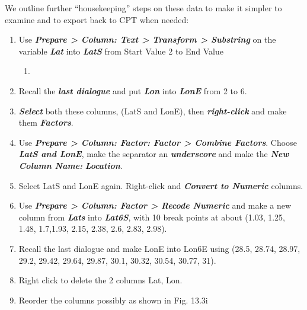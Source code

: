 \documentclass[
  letterpaper,
  DIV=11,
  numbers=noendperiod]{scrreprt}
\providecommand{\tightlist}{%
  \setlength{\itemsep}{0pt}\setlength{\parskip}{0pt}}\usepackage{longtable,booktabs,array}
\begin{document}
We outline further ``housekeeping'' steps on these data to make it
simpler to examine and to export back to CPT when needed:

\begin{enumerate}
\def\labelenumi{\alph{enumi})}
\item
  Use \textbf{\emph{Prepare \textgreater{} Column: Text \textgreater{}
  Transform \textgreater{} Substring}} on the variable
  \textbf{\emph{Lat}} into \textbf{\emph{LatS}} from Start Value 2 to
  End Value

  \begin{enumerate}
  \def\labelenumii{\arabic{enumii}.}
  \setcounter{enumii}{4}
  \tightlist
  \item
  \end{enumerate}
\item
  Recall the \textbf{\emph{last dialogue}} and put \textbf{\emph{Lon}}
  into \textbf{\emph{LonE}} from 2 to 6.
\item
  \textbf{\emph{Select}} both these columns, (LatS and LonE), then
  \textbf{\emph{right-click}} and make them \textbf{\emph{Factors}}.
\item
  Use \textbf{\emph{Prepare \textgreater{} Column: Factor: Factor
  \textgreater{} Combine Factors}}. Choose \textbf{\emph{LatS and
  LonE}}, make the separator an \textbf{\emph{underscore}} and make the
  \textbf{\emph{New Column Name:}} \textbf{\emph{Location}}.
\item
  Select LatS and LonE again. Right-click and \textbf{\emph{Convert to
  Numeric}} columns.
\item
  Use \textbf{\emph{Prepare \textgreater{} Column: Factor \textgreater{}
  Recode Numeric}} and make a new column from \textbf{\emph{Lats}} into
  \textbf{\emph{Lat6S}}, with 10 break points at about (1.03, 1.25,
  1.48, 1.7,1.93, 2.15, 2.38, 2.6, 2.83, 2.98).
\item
  Recall the last dialogue and make LonE into Lon6E using (28.5, 28.74,
  28.97, 29.2, 29.42, 29.64, 29.87, 30.1, 30.32, 30.54, 30.77, 31).
\item
  Right click to delete the 2 columns Lat, Lon.
\item
  Reorder the columns possibly as shown in Fig. 13.3i
\end{enumerate}
\end{document}
